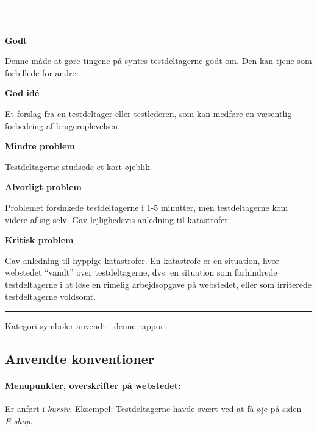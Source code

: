 \documentclass[10pt,a4paper]{article}      %
\newcommand\pic[1]{\texttt{[image: Pics/\#1]}}
\renewcommand\good{\pic{good}}
\renewcommand\goodidea{\pic{goodidea}}
\renewcommand\smallproblem{\pic{smallproblem}}
\renewcommand\seriousproblem{\pic{seriousproblem}}
\renewcommand\criticalproblem{\pic{criticalproblem}}
\begin{document}
\begin{table}[!ht]
\centering
\rule{\linewidth}{\heavyrulewidth}\\[6mm]
\begin{kommentarer}

\item[\good] \textbf{Godt}

Denne måde at gøre tingene på syntes testdeltagerne godt om. Den kan tjene som
forbillede for andre.

\item[\goodidea] \textbf{God idé}

Et forslag fra en testdeltager eller testlederen, som kan medføre en væsentlig
forbedring af brugeroplevelsen.

\item[\smallproblem] \textbf{Mindre problem}

Testdeltagerne studsede et kort øjeblik.

\item[\seriousproblem] \textbf{Alvorligt problem}

Problemet forsinkede testdeltagerne i 1-5 minutter, men testdeltagerne kom
videre af sig selv.  Gav lejlighedsvis anledning til katastrofer.

\item[\criticalproblem] \textbf{Kritisk problem}

Gav anledning til hyppige katastrofer. En katastrofe er en situation, hvor
webstedet ``vandt'' over testdeltagerne, dvs. en situation som forhindrede
testdeltagerne i at løse en rimelig arbejdsopgave på webstedet, eller som
irriterede testdeltagerne voldsomt.

\end{kommentarer}
\rule{\linewidth}{\heavyrulewidth}
\caption{Kategori symboler anvendt i denne rapport}
\label{tab:gt}
\end{table}

\subsection{Anvendte konventioner}

\paragraph{Menupunkter, overskrifter på webstedet:}
Er anført i \emph{kursiv}. Eksempel: Testdeltagerne havde svært ved at få øje på siden \emph{E-shop}.

\clearpage
\end{document}
